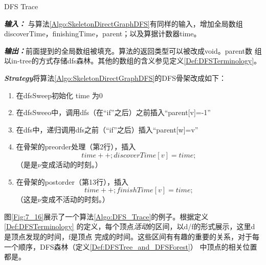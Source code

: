\begin{algorithm}\label{Algo:DFS_Trace}
DFS Trace

{\textbf{\emph{输入：}}} 与算法\ref{Algo:SkeletonDirectGraphDFS}有同样的输入，增加全局数组
discoverTime，finishingTime，parent；以及算据计数器time。

{\textbf{\emph{输出：}}}前面提到的全局数组被填充。算法的返回类型可以被改成void。parent数
组以in-tree的方式存储dfs森林。其他的数组的含义参见定义\ref{Def:DFSTerminology}。

{\textbf{\emph{Strategy}}}将算法\ref{Algo:SkeletonDirectGraphDFS}的DFS骨架改成如下：
\begin{enumerate}
\item 在dfsSweep初始化 time 为0
\item 在dfsSweeo中，调用dfs（在“if”之后）之前插入“parent[v]=-1”
\item 在dfs中，递归调用dfs之前（“if”之后）插入“parent[w]=v”
\item 在骨架的preorder处理（第2行），插入
      \begin{displaymath} time++; discoverTime[v] = time; \end{displaymath}
      （是是$\nu$变成活动的时刻。）
\item 在骨架的postorder（第13行），插入
      \begin{displaymath} time++; finishTime[v] = time; \end{displaymath}
      （这是$\nu$变成不活动的时刻。）
\end{enumerate}

\end{algorithm}

\begin{figure*}[!t]
    \centering
    \caption{DFS trace算法在例\ref{}的图上的进展。双线是还没有被回溯到的树的边，
            所以他们只想灰色的顶点。粗线是已经被回溯的树的边，所以他们指向黑色
            的顶点。d/f表示了顶点的发现和完成时间。两颗dfs树被构建出来。不同的
            顶点顺序可以产生不同的trace。}
    \label{Fig:7_16}
\end{figure*}

图\ref{Fig:7_16}展示了一个算法\ref{Algo:DFS_Trace}的例子。根据定义\ref{Def:DFSTerminology}
的定义，每个顶点\emph{活动}的区间，以d/f的形式展示，这里d是顶点发现的时间，f是顶点
完成的时间。这些区间有有趣的重要的关系，对于每一个顺序，DFS森林（定义\ref{Def:DFSTree_and_DFSForest}）
中顶点的相关位置都是。

